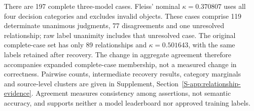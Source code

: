 There are 197 complete three-model cases. Fleiss' nominal $\kappa=0.370807$ uses all four decision categories and excludes invalid objects. These cases comprise 119 determinate unanimous judgments, 77 disagreements and one unresolved relationship; raw label unanimity includes that unresolved case. The original complete-case set has only 89 relationships and $\kappa=0.501643$, with the same labels retained after recovery. The change in aggregate agreement therefore accompanies expanded complete-case membership, not a measured change in correctness. Pairwise counts, intermediate recovery results, category marginals and source-level clusters are given in Supplement, Section~\ref{S-app:relationship-evidence}. Agreement measures consistency among assertions, not semantic accuracy, and supports neither a model leaderboard nor approved training labels.

